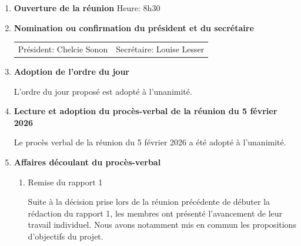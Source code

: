 \documentclass[12pt]{ULojpv}
\begin{document}
\entete
\begin{enumerate}

\item \textbf{Ouverture de la réunion}
Heure: 8h30

\item \textbf{Nomination ou confirmation du président et du secrétaire}

\begin{tabular}{@{}ll}
   Président: Chelcie Sonon
   & Secrétaire: Louise Lesser
\end{tabular}

\item \textbf{Adoption de l'ordre du jour}

L'ordre du jour proposé est adopté à l'unanimité.

\item \textbf{Lecture et adoption du procès-verbal de la réunion du 5 février 2026}

Le procès verbal de la réunion du 5 février 2026 a été adopté à l'unanimité.

\item \textbf{Affaires découlant du procès-verbal}
\begin{enumerate}
   \item Remise du rapport 1
   
Suite à la décision prise lors de la réunion précédente de débuter la rédaction du rapport 1, les membres ont présenté l’avancement de leur travail individuel. Nous avons notamment mis en commun les propositions d’objectifs du projet.
    

\end{enumerate}

\end{enumerate}
\end{document}
